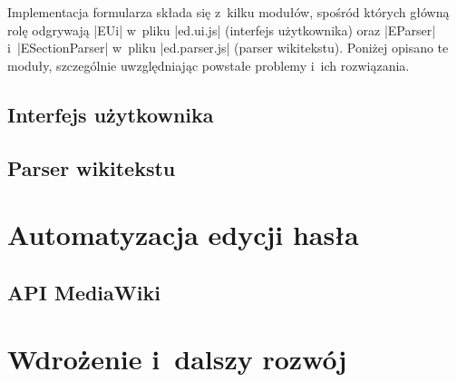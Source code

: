 Implementacja formularza składa się z~kilku modułów, spośród których główną rolę odgrywają \kod|EUi| w~pliku \kod|ed.ui.js| (interfejs użytkownika) oraz \kod|EParser| i~\kod|ESectionParser| w~pliku \kod|ed.parser.js| (parser wikitekstu). Poniżej opisano te moduły, szczególnie uwzględniając powstałe problemy i~ich rozwiązania.

\subsection{Interfejs użytkownika}


\subsection{Parser wikitekstu}

\section{Automatyzacja edycji hasła}

\subsection{API MediaWiki}

\label{sec:impl-auto}

\section{Wdrożenie i~dalszy rozwój}
\label{sec:impl-deploy}
